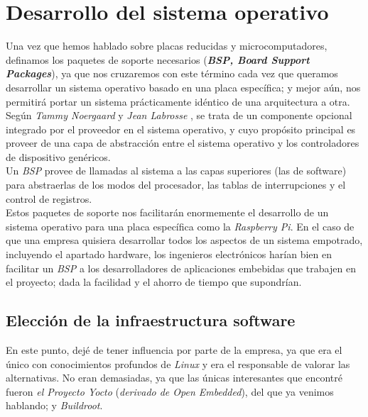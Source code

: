 \section{Desarrollo del sistema operativo}

Una vez que hemos hablado sobre placas reducidas y microcomputadores, definamos los paquetes de soporte necesarios (\textbf{\textit{BSP, Board Support Packages}}), ya que nos cruzaremos con este término cada vez que queramos desarrollar un sistema operativo basado en una placa específica; y mejor aún, nos permitirá portar un sistema prácticamente idéntico de una arquitectura a otra.\\

Según \textit{Tammy Noergaard} y \textit{Jean Labrosse} \cite{embedded-software-know-it-all-bsp}, se trata de un componente opcional integrado por el proveedor en el sistema operativo, y cuyo propósito principal es proveer de una capa de abstracción entre el sistema operativo y los controladores de dispositivo genéricos.\\

Un \textit{BSP} provee de llamadas al sistema a las capas superiores (las de software) para abstraerlas de los modos del procesador, las tablas de interrupciones y el control de registros.\\

Estos paquetes de soporte nos facilitarán enormemente el desarrollo de un sistema operativo para una placa específica como la \textit{Raspberry Pi}. En el caso de que una empresa quisiera desarrollar todos los aspectos de un sistema empotrado, incluyendo el apartado hardware, los ingenieros electrónicos harían bien en facilitar un \textit{BSP} a los desarrolladores de aplicaciones embebidas que trabajen en el proyecto; dada la facilidad y el ahorro de tiempo que supondrían.\\

\subsection{Elección de la infraestructura software}

En este punto, dejé de tener influencia por parte de la empresa, ya que era el único con conocimientos profundos de \textit{Linux} y era el responsable de valorar las alternativas. No eran demasiadas, ya que las únicas interesantes que encontré fueron \textit{el Proyecto Yocto} (\textit{derivado de Open Embedded}), del que ya venimos hablando; y \textit{Buildroot}.\\

